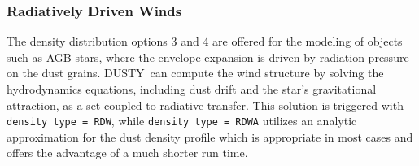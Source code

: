 \documentclass[11pt]{article}
\def\D  {{\sf DUSTY}}
\begin{document}
\subsubsection{Radiatively Driven Winds}
\label{winds}

The density distribution options 3 and 4 are offered for the modeling of
objects such as AGB stars, where the envelope expansion is driven by radiation
pressure on the dust grains. \D\ can compute the wind structure by solving the
hydrodynamics equations, including dust drift and the star's gravitational
attraction, as a set coupled to radiative transfer.  This solution is triggered
with {\tt density type = RDW}, while {\tt density type = RDWA} utilizes an analytic
approximation for the dust density profile which is appropriate in most cases
and offers the advantage of a much shorter run time.
\end{document}
